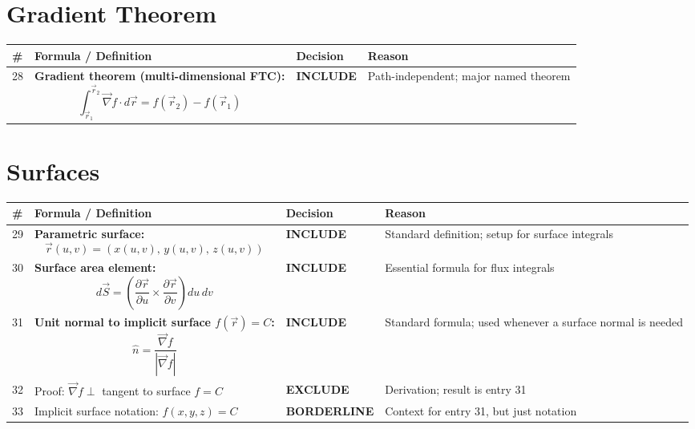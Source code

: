 \documentclass[11pt,a4paper]{article}
\newcommand{\inc}{\textbf{\textcolor{incgreen}{INCLUDE}}}
\newcommand{\exc}{\textbf{\textcolor{exred}{EXCLUDE}}}
\newcommand{\bord}{\textbf{\textcolor{borderorange}{BORDERLINE}}}
\begin{document}
\section{Gradient Theorem}

\begin{longtable}{p{0.5cm} p{7.5cm} p{2.2cm} p{3.5cm}}
\toprule
\# & Formula / Definition & Decision & Reason \\
\midrule
\endhead

28 & \textbf{Gradient theorem (multi-dimensional FTC):}
\[
  \int_{\vec{r}_1}^{\vec{r}_2} \vec{\nabla}f\cdot d\vec{r} = f(\vec{r}_2) - f(\vec{r}_1)
\]
& \inc & Path-independent; major named theorem \\[6pt]

\bottomrule
\end{longtable}

\section{Surfaces}

\begin{longtable}{p{0.5cm} p{7.5cm} p{2.2cm} p{3.5cm}}
\toprule
\# & Formula / Definition & Decision & Reason \\
\midrule
\endhead

29 & \textbf{Parametric surface:}
\[
  \vec{r}(u,v) = (x(u,v),\,y(u,v),\,z(u,v))
\]
& \inc & Standard definition; setup for surface integrals \\[14pt]

30 & \textbf{Surface area element:}
\[
  d\vec{S} = \left(\frac{\partial\vec{r}}{\partial u}\times\frac{\partial\vec{r}}{\partial v}\right)du\,dv
\]
& \inc & Essential formula for flux integrals \\[14pt]

31 & \textbf{Unit normal to implicit surface $f(\vec{r})=C$:}
\[
  \hat{n} = \frac{\vec{\nabla}f}{|\vec{\nabla}f|}
\]
& \inc & Standard formula; used whenever a surface normal is needed \\[14pt]

32 & Proof: $\vec{\nabla}f \perp$ tangent to surface $f=C$ & \exc & Derivation; result is entry 31 \\[6pt]

33 & Implicit surface notation: $f(x,y,z)=C$ & \bord & Context for entry 31, but just notation \\[6pt]

\bottomrule
\end{longtable}
\end{document}

